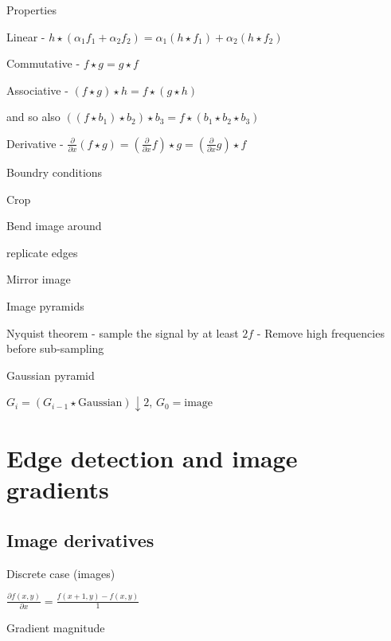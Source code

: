 \documentclass{article}
\begin{document}
\begin{multicols*}{2}
{\begin{compactitem}
	\item Properties
	
	\begin{compactitem}
		\item Linear - $h \star (\alpha_1f_1+\alpha_2f_2) = \alpha_1(h \star f_1) + \alpha_2(h \star f_2)$
		\item Commutative - $f \star g = g \star f$
		\item Associative - $(f \star g) \star h = f \star (g \star h)$
		
		and so also $((f \star b_1) \star b_2) \star b_3 = f \star (b_1 \star b_2 \star b_3)$
		
		\item Derivative -
		$\frac{\partial}{\partial x}(f \star g) = (\frac{\partial}{\partial x}f) \star g = (\frac{\partial}{\partial x}g) \star f$
	\end{compactitem}

	\item Boundry conditions
	\begin{compactitem}
		\item Crop
		\item Bend image around
		\item replicate edges
		\item Mirror image
	\end{compactitem}

	\item Image pyramids
	
	Nyquist theorem - sample the signal by at least $2f$
	- Remove high frequencies before sub-sampling
	
	Gaussian pyramid
	
	$G_i = (G_{i - 1} \star \text{Gaussian}) \downarrow 2$, $G_0 = \text{image}$

\end{compactitem}

\section{Edge detection and image gradients}

\subsection{Image derivatives}

Discrete case (images)

$\frac{\partial f(x,y)}{\partial x} = \frac{f(x+1, y)-f(x,y)}{1}$

Gradient magnitude

}
\end{multicols*}
\end{document}
